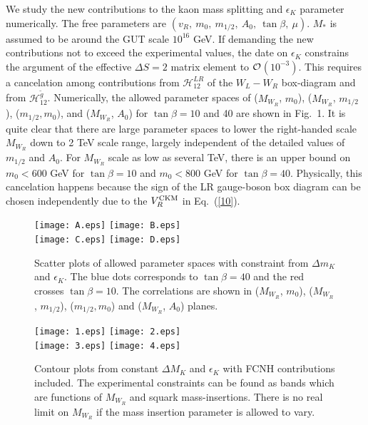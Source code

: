 \documentclass[prd,aps,preprint,tightenlines,superscriptaddress]{revtex4}
\begin{document}
We study the new contributions to the kaon mass splitting and $\epsilon_K$ parameter numerically.
The free parameters are $(v_R,~m_0,~m_{1/2},~A_0,~\tan\beta,~\mu)$. $M_*$ is assumed to be around the GUT scale $10^{16}$ GeV. If demanding the new contributions not to exceed the experimental values, the date on $\epsilon_K$ constrains the argument of the effective $\Delta S=2$ matrix element to $\cal{O}$$(10^{-3})$. This requires a cancelation among contributions from $\mathscr H_{12}^{LR}$ of the $W_L-W_R$ box-diagram and from $\mathscr H_{12}^{\widetilde g}$. Numerically, the allowed parameter spaces of ($M_{W_R}$, $m_0$), ($M_{W_R}$, $m_{1/2}$), ($m_{1/2}, m_0)$, and ($M_{W_R}$, $A_0$) for $\tan\beta = 10$ and 40 are shown in Fig.~1. It is quite clear that there are large parameter spaces to lower the right-handed scale $M_{W_R}$ down to 2 TeV scale range, largely independent of the detailed values of $m_{1/2}$ and $A_0$.  For $M_{W_R}$ scale as low as several TeV, there is an upper bound on $m_0 < 600$ GeV for $\tan\beta=10$ and $m_0<800$ GeV for $\tan\beta=40$. Physically, this cancelation happens because the sign of the LR gauge-boson box diagram can be chosen independently due to the $V_R^{\rm CKM}$ in Eq.~(\ref{10}). 

\begin{figure}
\begin{center}
\texttt{[image: A.eps]}
\texttt{[image: B.eps]} \\
\texttt{[image: C.eps]}
\texttt{[image: D.eps]}
\caption{Scatter plots of allowed parameter spaces with constraint from $\Delta m_K$ and
$\epsilon_K$. The blue dots corresponds to $\tan\beta=40$ and the red crosses $\tan\beta=10$. The correlations are shown in ($M_{W_R}$, $m_0$), ($M_{W_R}$, $m_{1/2}$), ($m_{1/2}, m_0$) and ($M_{W_R}$, $A_0$) planes.}
\end{center}
\end{figure}

\begin{figure}
\begin{center}
\texttt{[image: 1.eps]}
\texttt{[image: 2.eps]} \\
\texttt{[image: 3.eps]}
\texttt{[image: 4.eps]}
\caption{Contour plots from constant $\Delta M_K$ and $\epsilon_K$ with FCNH contributions included. The experimental constraints can be found as bands which are functions of $M_{W_R}$ and squark mass-insertions. There is no real limit on $M_{W_R}$ if the mass insertion parameter is allowed to vary. }
\end{center}
\end{figure}
\end{document}
